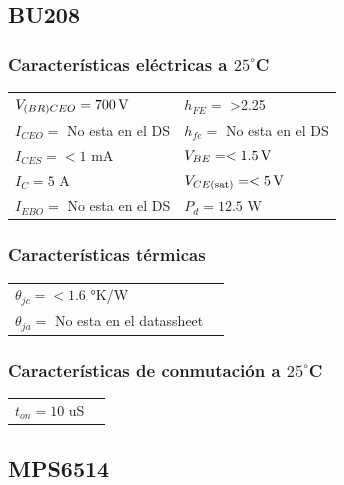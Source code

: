 \documentclass[chaptersright]{informeutn}
\begin{document}
  \subsection{BU208}

   \subsubsection{Características eléctricas a $25^\circ$C}
    \begin{tabular}{ll}
    $V_{(BR)CEO} =  700 \,\mathrm{V}$         & \hspace{2cm} $h_{FE} =$ >2.25 \\
    $I_{CEO} = $ No esta en el DS           & \hspace{2cm} $h_{fe} = $ No esta en el DS \\
    $I_{CES} = <1 $ mA               & \hspace{2cm} $V_{BE} = <1.5 \,\mathrm{V} $ \\
    $I_C = 5$ A                & \hspace{2cm} $V_{CE(\text{sat})} = <5 \,\mathrm{V} $ \\
    $I_{EBO} = $ No esta en el DS              & \hspace{2cm} $P_d = 12.5$ W \\
    \end{tabular}
    
    \subsubsection{Características térmicas}
    \begin{tabular}{ll}
    $\theta_{jc} = <1.6$ °K/W \\
    $\theta_{ja} = $ No esta en el datassheet \\
    \end{tabular}
    
    \subsubsection{Características de conmutación a $25^\circ$C}
    \begin{tabular}{ll}
    $t_{on} = 10$ uS \\
    \end{tabular}

  \subsection{MPS6514}
\end{document}
